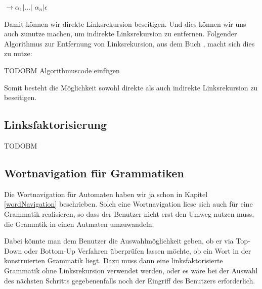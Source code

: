  $\to \alpha_1$$|\ldots|$
$\alpha_n$$|\epsilon$\vspace{10pt}

\noindent Damit können wir direkte Linksrekursion beseitigen. Und dies können wir
uns auch zunutze machen, um indirekte Linksrekursion zu entfernen. Folgender
Algorithmus zur Entfernung von Linksrekursion, aus dem Buch \cite{Compilers},
macht sich dies zu nutze:\vspace{10pt}

TODOBM Algorithmuscode einfügen\vspace{10pt}

Somit besteht die Möglichkeit sowohl direkte als auch indirekte Linksrekursion
zu beseitigen.





\subsection{Linksfaktorisierung}

TODOBM

\subsection{Wortnavigation für Grammatiken}

Die Wortnavigation für Automaten haben wir ja schon in Kapitel
\ref{wordNavigation} beschrieben. Solch eine Wortnavigation liese sich auch
für eine Grammatik realisieren, so dass der Benutzer nicht erst den Umweg
nutzen muss, die Grammtik in einen Autmaten umzuwandeln.\vspace{10pt}

Dabei könnte man dem Benutzer die Auswahlmöglichkeit geben, ob er via
Top-Down oder Bottom-Up Verfahren überprüfen lassen möchte, ob ein Wort in der
konstruierten Grammatik liegt. Dazu muss dann eine linksfaktorisierte Grammatik
ohne Linksrekursion verwendet werden, oder es wäre bei der Auswahl des nächsten
Schritts gegebenenfalls noch der Eingriff des Benutzers
erforderlich.\vspace{10pt}


